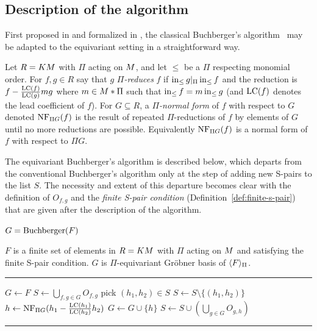 \subsection{Description of the algorithm}
First proposed in \cite{aschenbrenner2007finite} and formalized in \cite{Brouwer09e}, the classical Buchberger's algorithm~\cite{buchberger1965algorithmus} may be adapted to the equivariant setting in a straightforward way.

Let $R = KM$ with $\Pi$ acting on $M$, and let $\leq$ be a $\Pi$ respecting monomial order.  For $f,g \in R$ say that $g$ {\em $\Pi$-reduces} $f$ if $\operatorname{in}_{\leq} g |_{\Pi} \operatorname{in}_{\leq} f$ and the reduction is $f - \frac{\operatorname{LC}(f)}{\operatorname{LC}(g)}mg$ where $m \in M *\Pi$ such that $\operatorname{in}_{\leq} f = m\operatorname{in}_{\leq} g$ (and $\operatorname{LC}(f)$ denotes the lead coefficient of $f$).  For $G \subseteq R$, a {\em $\Pi$-normal form} of $f$ with respect to $G$ denoted $\operatorname{NF}_{\Pi G}(f)$ is the result of repeated $\Pi$-reductions of $f$ by elements of $G$ until no more reductions are possible.  Equivalently $\operatorname{NF}_{\Pi G}(f)$ is a normal form of $f$ with respect to $\Pi G$.

The equivariant Buchberger's algorithm is described below, which departs from the conventional Buchberger's algorithm only at the step of adding new S-pairs to the list $S$.  The necessity and extent of this departure becomes clear with the definition of $O_{f,g}$ and the {\em finite S-pair condition} (Definition~\ref{def:finite-s-pair}) that are given after the description of the algorithm.

\begin{algorithm}\label{alg:Buchberger}
$G = \operatorname{Buchberger}(F)$
\begin{algorithmic}[1]
\REQUIRE $F$ is a finite set of elements in $R = KM$ with $\Pi$ acting on $M$ and satisfying the finite S-pair condition.
\ENSURE $G$ is $\Pi$-equivariant Gr\"obner basis of $\langle F \rangle_{\Pi}$.

\smallskip \hrule \smallskip

\STATE $G\gets F$
\STATE $S\gets \bigcup_{f,g\in G} O_{f,g}$
	\STATE pick $(h_1,h_2) \in S$
	\STATE $S\gets S\setminus\{(h_1,h_2)\}$ 
	\STATE $h \gets \operatorname{NF}_{\Pi G}(h_1 - \frac{\operatorname{LC}(h_1)}{\operatorname{LC}(h_2)}h_2)$
		\STATE $G\gets G\cup \{h\}$
		\STATE $S\gets S\cup \left(\bigcup_{g\in G}O_{g,h}\right)$
	\ENDIF
\ENDWHILE
\smallskip \hrule \smallskip
\end{algorithmic}
\end{algorithm}

